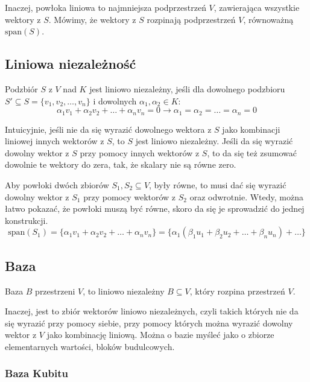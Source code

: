 \documentclass{../notatki}
\begin{document}
Inaczej, powłoka liniowa to najmniejsza podprzestrzeń $V$, zawierająca wszystkie
wektory z $S$. Mówimy, że wektory z $S$ rozpinają podprzestrzeń $V$, równoważną
$\mathrm{span}(S)$.

\subsection{Liniowa niezależność}

Podzbiór $S$ z $V$ nad $K$ jest liniowo niezależny, jeśli dla dowolnego
podzbioru $S' \subseteq S = \{v_1, v_2, \dots, v_n\}$ i dowolnych
$\alpha_1, \alpha_2 \in K$:
$$
\alpha_1 v_1 + \alpha_2 v_2 + \dots + \alpha_n v_n  = 0 \rightarrow
\alpha_1 = \alpha_2 = \dots = \alpha_n = 0
$$

Intuicyjnie, jeśli nie da się wyrazić dowolnego wektora z $S$ jako kombinacji
liniowej innych wektorów z $S$, to $S$ jest liniowo niezależny. Jeśli da się
wyrazić dowolny wektor z $S$ przy pomocy innych wektorów z $S$, to da się też
zsumować dowolnie te wektory do zera, tak, że skalary nie są równe zero.

\begin{examplebox}
  Aby powłoki dwóch zbiorów $S_1, S_2 \subseteq V$, były równe, to musi dać
  się wyrazić dowolny wektor z $S_1$ przy pomocy wektorów z $S_2$
  oraz odwrotnie. Wtedy, można łatwo pokazać, że powłoki muszą być równe, skoro
  da się je sprowadzić do jednej konstrukcji.
  $$
  \mathrm{span}(S_1) = \{\alpha_1 v_1 + \alpha_2 v_2 + \dots +
  \alpha_n v_n\} = \{\alpha_1 (\beta_1 u_1 + \beta_2 u_2 + \dots +
  \beta_n u_n) + \dots\}
  $$
\end{examplebox}

\subsection{Baza}

Baza $B$ przestrzeni $V$, to liniowo niezależny $B \subseteq V$, który rozpina
przestrzeń $V$.

Inaczej, jest to zbiór wektorów liniowo niezależnych, czyli takich których
nie da się wyrazić przy pomocy siebie, przy pomocy których można wyrazić dowolny
wektor z $V$ jako kombinację liniową. Można o bazie myśleć jako o zbiorze
elementarnych wartości, bloków budulcowych.

\subsubsection{Baza Kubitu}
\end{document}
